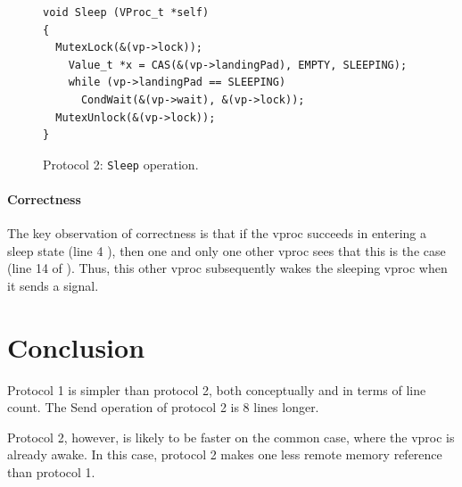 \documentclass[11pt]{article}
\begin{document}
\begin{figure}
\lstset{language=C}
\lstset{commentstyle=\textit}
\lstset{numbers=left}
\begin{lstlisting}
void Sleep (VProc_t *self)
{
  MutexLock(&(vp->lock));
    Value_t *x = CAS(&(vp->landingPad), EMPTY, SLEEPING);
    while (vp->landingPad == SLEEPING)
      CondWait(&(vp->wait), &(vp->lock));
  MutexUnlock(&(vp->lock));
}
\end{lstlisting}
\caption{Protocol 2: \texttt{Sleep} operation.}\label{fig:protocol2-sleep}
\end{figure}

\paragraph{Correctness}
The key observation of correctness is that if the vproc succeeds in entering a sleep
state (line 4 ), then one and only one other vproc sees 
that this is the case (line 14 of ).
Thus, this other vproc subsequently wakes the sleeping vproc when it sends a signal.

\section{Conclusion}\label{sec:conclusion}
Protocol 1 is simpler than protocol 2, both conceptually and in terms of line count.
The Send operation of protocol 2 is 8 lines longer.

Protocol 2, however, is likely to be faster on the common case, where the vproc is
already awake.
In this case, protocol 2 makes one less remote memory reference than protocol 1.
\end{document}
